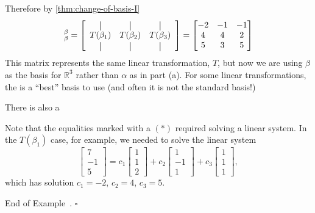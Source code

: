 \documentclass[10pt]{article}
\theoremstyle{definition}
\newtheorem{example}[theorem]{Example}
\renewenvironment{example}
{\begin{oldexample}}
  {\par\smallskip\hfill   End of Example~\theexample. $\square$    \par\end{oldexample}}
\newcommand{\R}{\mathbb{R}}           %
\begin{document}
\begin{example}[Example 1 in Section 5.3]
\begin{enumerate}[(a)]
    Therefore by \cref{thm:change-of-basis-I}
    \newcommand*{\vertbar}{\rule[-1ex]{0.5pt}{2.5ex}}
    \newcommand*{\horzbar}{\,\rule[.5ex]{2.5ex}{0.5pt}\,}
    \begin{equation*}
      [T]_{\beta}^{\beta}
      = 
      \begin{bmatrix}
        \begin{array}{ccc}
          \vertbar & \vertbar &         \vertbar \\
          T(\beta_{1})    & T(\beta_{2})   & T(\beta_{3})    \\
          \vertbar & \vertbar &         \vertbar 
        \end{array}
      \end{bmatrix}
      =
      \begin{bmatrix}
        -2&-1&-1\\
        4&4&2\\
        5&3&5
      \end{bmatrix}
    \end{equation*}
    This matrix represents the same linear transformation, $T$, but now we are
    using $\beta$ as the basis for $\R^{3}$ rather than $\alpha$ as in part (a).
    For some linear transformations, the is a ``best'' basis to use (and often
    it is not the standard basis!)

    There is also a 

    \begin{tcolorbox}[colframe=black, colback=gray!5, arc=2mm, boxrule=0.8pt,
      breakable, title=The starred equalities above,   coltitle=black,colbacktitle=black!10]
      Note that the equalities marked with a $(*)$ required solving a linear
      system. In the $T(\beta_{1})$ case, for example, we needed to solve the
      linear system
      \begin{equation*}
        \begin{bmatrix}
          7\\-1\\5
        \end{bmatrix}
        = c_{1}
        \begin{bmatrix}
          1\\1\\2
        \end{bmatrix}
        +
        c_{2}
        \begin{bmatrix}
          1\\-1\\1
        \end{bmatrix}
        +c_{3}
        \begin{bmatrix}
          1\\1\\1
        \end{bmatrix},
      \end{equation*}
      which has solution $c_{1}=-2$, $c_{2}=4$, $c_{3}=5$.
    \end{tcolorbox}



\end{enumerate}
\end{example}
\end{document}
